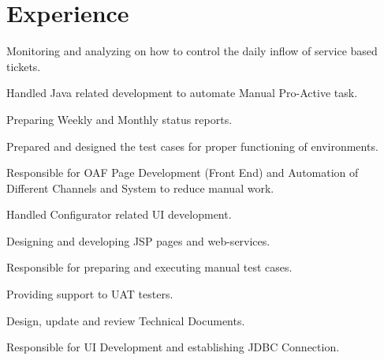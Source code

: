 \documentclass[letterpaper]{deedy-resume-openfont}
\begin{document}
\hfill
\begin{minipage}[t]{0.66\textwidth} 


\section{Experience}

\vspace{\topsep} %
\begin{tightemize}
\item Monitoring and analyzing on how to control the daily inflow of service based tickets.
\item Handled Java related development to automate Manual Pro-Active task.
\item Preparing Weekly and Monthly status reports.
\item Prepared and designed the test cases for proper functioning of environments.
\end{tightemize}
\sectionsep

\begin{tightemize}
\item Responsible for OAF Page Development (Front End) and Automation of Different Channels and System to reduce manual work.
\item Handled Configurator related UI development.
\item Designing and developing JSP pages and web-services.
\item Responsible for preparing and executing manual test cases.
\item Providing support to UAT testers.
\item Design, update and review Technical Documents.
\end{tightemize}
\sectionsep

\begin{tightemize}
\item Responsible for UI Development and establishing JDBC Connection.
\end{tightemize}
\sectionsep


\end{minipage}
\end{document}
